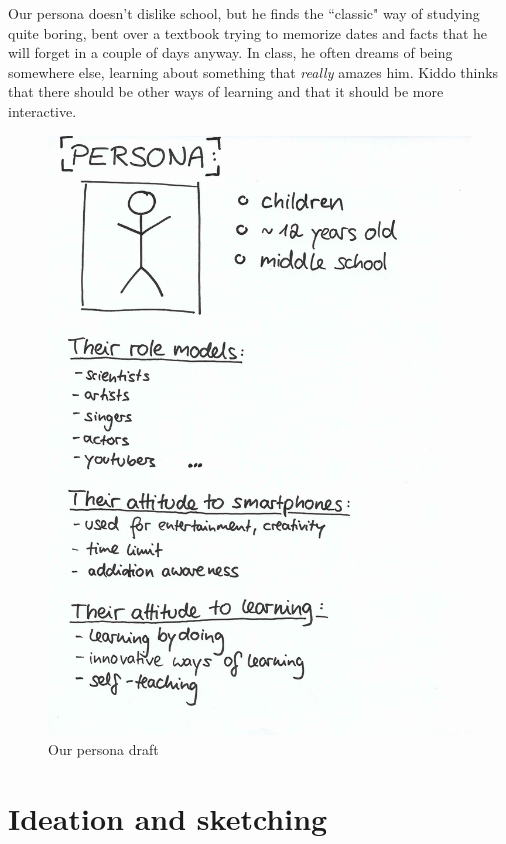 \documentclass[12pt]{scrartcl}
\begin{document}
	Our persona doesn't dislike school, but he finds the ``classic" way of studying quite boring, bent over a textbook trying to memorize 
	dates and facts that he will forget in a couple of days anyway. In class, he often dreams of being somewhere else, learning 
	about something that \textit{really} amazes him. Kiddo thinks that there should be other ways of learning and that it should be
	more interactive.\\	
	
	\begin{figure}[H]
        		\centering
       		\includegraphics[width=\textwidth]{../images/persona.jpg}
       		\caption{Our persona draft}
        		\label{persona1}
	\end{figure}
	

\section{Ideation and sketching}
\end{document}
